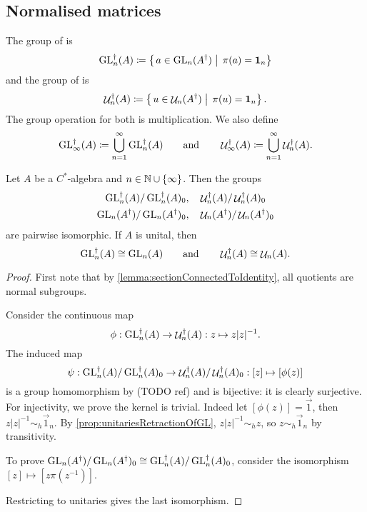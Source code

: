 \subsection{Normalised matrices}
\begin{definition}
The group of  is
\[ \operatorname{GL}_n^\dagger(A) \coloneqq \left\{\left. a\in \operatorname{GL}_n(A^\dagger) \;\right|\; \pi(a) = \bm{\mathrm{1}}_n \right\} \]
and the group of  is
\[ \mathop{\mathcal{U}}\nolimits_n^\dagger(A) \coloneqq \left\{\left. u\in \mathop{\mathcal{U}}\nolimits_n(A^\dagger) \;\right|\; \pi(u) = \bm{\mathrm{1}}_n \right\}. \]
The group operation for both is multiplication. We also define
\[ \operatorname{GL}_\infty^\dagger(A) \coloneqq \bigcup_{n=1}^\infty\operatorname{GL}_n^\dagger(A) \qquad \text{and}\qquad \mathop{\mathcal{U}}\nolimits_\infty^\dagger(A) \coloneqq \bigcup_{n=1}^\infty\mathop{\mathcal{U}}\nolimits_n^\dagger(A). \]
\end{definition}

\begin{proposition} \label{prop:normalisedQuotientsIsomorphisms}
Let $A$ be a $C^*$-algebra and $n\in \mathbb{N}\cup\{\infty\}$. Then the groups
\begin{align*}
\operatorname{GL}_n^\dagger(A) / \operatorname{GL}_n^\dagger(A)_0,& & &\mathop{\mathcal{U}}\nolimits_n^\dagger(A) / \mathop{\mathcal{U}}\nolimits_n^\dagger(A)_0 \\
\operatorname{GL}_n(A^\dagger) / \operatorname{GL}_n(A^\dagger)_0,& & &\mathop{\mathcal{U}}\nolimits_n(A^\dagger) / \mathop{\mathcal{U}}\nolimits_n(A^\dagger)_0
\end{align*}
are pairwise isomorphic. If $A$ is unital, then 
\[ \operatorname{GL}_n^\dagger(A) \cong \operatorname{GL}_n(A) \qquad \text{and} \qquad \mathop{\mathcal{U}}\nolimits_n^\dagger(A) \cong \mathop{\mathcal{U}}\nolimits_n(A). \]
\end{proposition}
\begin{proof}
First note that by \ref{lemma:sectionConnectedToIdentity}, all quotients are normal subgroups.

Consider the continuous map
\[ \phi: \operatorname{GL}_n^\dagger(A) \to \mathop{\mathcal{U}}\nolimits_n^\dagger(A): z\mapsto z|z|^{-1}. \]
The induced map
\[ \psi: \operatorname{GL}_n^\dagger(A) / \operatorname{GL}_n^\dagger(A)_0 \to \mathop{\mathcal{U}}\nolimits_n^\dagger(A) / \mathop{\mathcal{U}}\nolimits_n^\dagger(A)_0: [z] \mapsto [\phi(z)] \]
is a group homomorphism by (TODO ref) and is bijective: it is clearly surjective. For injectivity, we prove the kernel is trivial.
Indeed let $[\phi(z)] = \vec{1}$, then $z|z|^{-1} \sim_h \vec{1}_n$. By \ref{prop:unitariesRetractionOfGL}, $z|z|^{-1}\sim_h z$, so $z\sim_h \vec{1}_n$ by transitivity.

To prove $\operatorname{GL}_n(A^\dagger) / \operatorname{GL}_n(A^\dagger)_0 \cong \operatorname{GL}_n^\dagger(A) / \operatorname{GL}_n^\dagger(A)_0$, consider the isomorphism $[z] \mapsto [z\pi(z^{-1})]$.

Restricting to unitaries gives the last isomorphism.
\end{proof}

